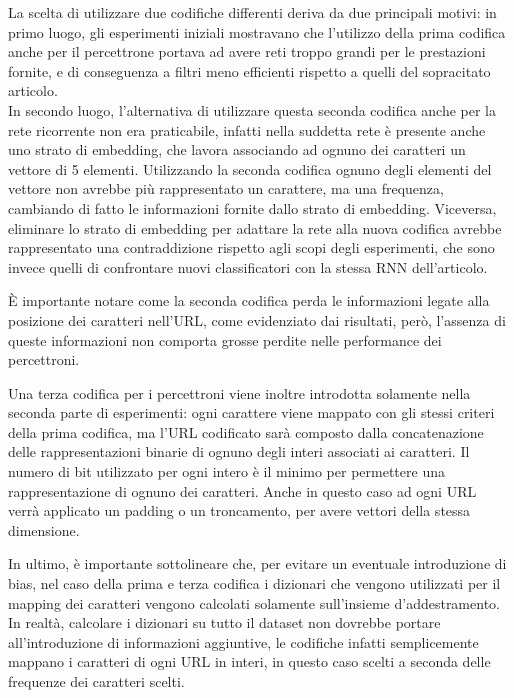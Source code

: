 \documentclass[../../main.tex]{subfiles}
\begin{document}
    La scelta di utilizzare due codifiche differenti deriva da due principali motivi: in primo luogo, gli esperimenti iniziali mostravano che l'utilizzo della prima codifica anche per il percettrone portava ad avere reti troppo grandi per le prestazioni fornite, e di conseguenza a filtri meno efficienti rispetto a quelli del sopracitato articolo.\\
    In secondo luogo, l'alternativa di utilizzare questa seconda codifica anche per la rete ricorrente non era praticabile, infatti nella suddetta rete è presente anche uno strato di embedding, che lavora associando ad ognuno dei caratteri un vettore di 5 elementi. Utilizzando la seconda codifica ognuno degli elementi del vettore non avrebbe più rappresentato un carattere, ma una frequenza, cambiando di fatto le informazioni fornite dallo strato di embedding. Viceversa, eliminare lo strato di embedding per adattare la rete alla nuova codifica avrebbe rappresentato una contraddizione rispetto agli scopi degli esperimenti, che sono invece quelli di confrontare nuovi classificatori con la stessa RNN dell'articolo.

    È importante notare come la seconda codifica perda le informazioni legate alla posizione dei caratteri nell'URL, come evidenziato dai risultati, però, l'assenza di queste informazioni non comporta grosse perdite nelle performance dei percettroni.

    Una terza codifica per i percettroni viene inoltre introdotta solamente nella seconda parte di esperimenti: ogni carattere viene mappato con gli stessi criteri della prima codifica, ma l'URL codificato sarà composto dalla concatenazione delle rappresentazioni binarie di ognuno degli interi associati ai caratteri. Il numero di bit utilizzato per ogni intero è il minimo per permettere una rappresentazione di ognuno dei caratteri. Anche in questo caso ad ogni URL verrà applicato un padding o un troncamento, per avere vettori della stessa dimensione.

    In ultimo, è importante sottolineare che, per evitare un eventuale introduzione di bias, nel caso della prima e terza codifica i dizionari che vengono utilizzati per il mapping dei caratteri vengono calcolati solamente sull'insieme d'addestramento. In realtà, calcolare i dizionari su tutto il dataset non dovrebbe portare all'introduzione di informazioni aggiuntive, le codifiche infatti semplicemente mappano i caratteri di ogni URL in interi, in questo caso scelti a seconda delle frequenze dei caratteri scelti.
\end{document}
